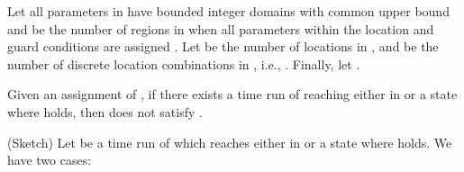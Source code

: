 \begin{lemma}\label{lem:k}
Let all parameters in  have bounded integer domains with common
upper bound  and  be the number of regions in 
when all parameters within the location and guard conditions are
assigned . Let  be the number
of locations in , and  be the
number of discrete location combinations in , i.e., . Finally, let .

Given  an
assignment of , if there exists a time run of
 reaching either  in
 or a state where 
holds, then  does not satisfy .







	
\end{lemma}

\proof (Sketch) Let  be a time run of
 which reaches either  in
 or a state where 
holds. We have two cases:

